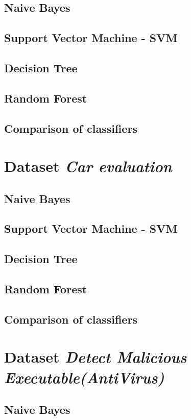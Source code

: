 \documentclass[11pt,a4paper,titlepage]{article}
\begin{document}
\subsection{Naive Bayes}
\subsection{Support Vector Machine - SVM}
\subsection{Decision Tree}
\subsection{Random Forest}
\subsection{Comparison of classifiers}

\section{Dataset \textit{Car evaluation}}

\subsection{Naive Bayes}
\subsection{Support Vector Machine - SVM}
\subsection{Decision Tree}
\subsection{Random Forest}
\subsection{Comparison of classifiers}

\section{Dataset \textit{Detect Malicious Executable(AntiVirus)}}

\subsection{Naive Bayes}
\end{document}
